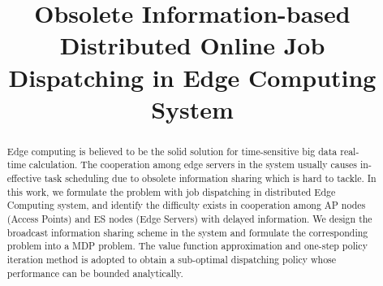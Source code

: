 \documentclass[10pt, conference, letterpaper]{IEEEtran}
\begin{document}
    \title{
        Obsolete Information-based Distributed Online Job Dispatching in Edge Computing System
    }
    \author{
    }
    \maketitle

    \begin{abstract}
        \label{sec:abstract}
        Edge computing is believed to be the solid solution for time-sensitive big data real-time calculation. The cooperation among edge servers in the system usually causes in-effective task scheduling due to obsolete information sharing which is hard to tackle.
        In this work, we formulate the problem with job dispatching in distributed Edge Computing system, and identify the difficulty exists in cooperation among AP nodes (Access Points) and ES nodes (Edge Servers) with delayed information. We design the broadcast information sharing scheme in the system and formulate the corresponding problem into a MDP problem. The value function approximation and one-step policy iteration method is adopted to obtain a sub-optimal dispatching policy whose performance can be bounded analytically.
    \end{abstract}

\end{document}
